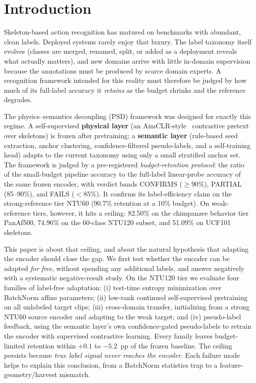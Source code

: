 \documentclass[preprint,12pt,number]{elsarticle}
\begin{document}
\section{Introduction}

Skeleton-based action recognition has matured on benchmarks with abundant,
clean labels. Deployed systems rarely enjoy that luxury. The label taxonomy
itself evolves (classes are merged, renamed, split, or added as a deployment
reveals what actually matters), and new domains arrive with little in-domain
supervision because the annotations must be produced by scarce domain
experts. A recognition framework intended for this reality must therefore be
judged by how much of its full-label accuracy it \emph{retains} as the budget
shrinks and the reference degrades.

The physics--semantics decoupling (PSD) framework was designed for exactly
this regime. A self-supervised \textbf{physical layer} (an AimCLR-style~\cite{aimclr}
contrastive pretext over skeletons) is frozen after pretraining; a
\textbf{semantic layer} (rule-based seed extraction, anchor clustering,
confidence-filtered pseudo-labels, and a self-training head) adapts to the
current taxonomy using only a small stratified anchor set. The framework is judged by a
pre-registered \emph{budget-retention protocol}: the ratio of the small-budget
pipeline accuracy to the full-label linear-probe accuracy of the same frozen
encoder, with verdict bands CONFIRMS ($\ge 90\%$), PARTIAL (85--90\%), and FAILS
($<85\%$). It confirms its label-efficiency claim on the strong-reference
tier NTU60 (90.7\% retention at a 10\% budget). On weak-reference
tiers, however, it hits a ceiling: 82.50\% on the chimpanzee behavior tier
PanAf500, 74.96\% on the 60-class NTU120 subset, and 51.09\% on UCF101
skeletons.

This paper is about that ceiling, and about the natural hypothesis that
adapting the encoder should close the gap. We first test whether the encoder
can be adapted \emph{for free}, without spending any additional labels,
and answer negatively with a systematic negative-result study. On the NTU120
tier we evaluate four families of label-free adaptation: (i) test-time
entropy minimization over BatchNorm affine parameters; (ii) low-rank
continued self-supervised pretraining on all unlabeled target clips; (iii)
cross-domain transfer, initializing from a strong NTU60 source encoder and
adapting to the weak target; and (iv) pseudo-label feedback, using the
semantic layer's own confidence-gated pseudo-labels to retrain the encoder
with supervised contrastive learning. Every family leaves budget-limited
retention within $+0.1$ to $-5.2$~pp of the frozen baseline. The ceiling persists
because \emph{true label signal never reaches the encoder}.
Each failure mode helps to explain this conclusion,
from a BatchNorm statistics trap to a feature-geometry/harvest mismatch.
\end{document}
